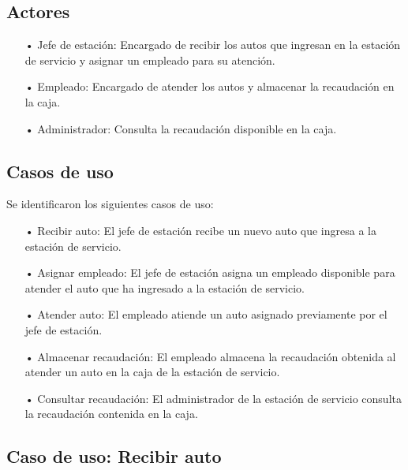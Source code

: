 \documentclass[12pt,a4paper,titlepage,oneside]{article}
\begin{document}
\subsection{Actores}
\begin{enumerate}
\item[•] Jefe de estación: Encargado de recibir los autos que ingresan en la estación de servicio y asignar un empleado para su atención.
\item[•] Empleado: Encargado de atender los autos y almacenar la recaudación en la caja.
\item[•] Administrador: Consulta la recaudación disponible en la caja.
\end{enumerate}

\subsection{Casos de uso}
Se identificaron los siguientes casos de uso:

\begin{enumerate}
\item[•] Recibir auto: El jefe de estación recibe un nuevo auto que ingresa a la estación de servicio.
\item[•] Asignar empleado: El jefe de estación asigna un empleado disponible para atender el auto que ha ingresado a la estación de servicio.
\item[•] Atender auto: El empleado atiende un auto asignado previamente por el jefe de estación.
\item[•] Almacenar recaudación: El empleado almacena la recaudación obtenida al atender un auto en la caja de la estación de servicio.
\item[•] Consultar recaudación: El administrador de la estación de servicio consulta la recaudación contenida en la caja.
\end{enumerate}

\subsection{Caso de uso: Recibir auto}
\end{document}
